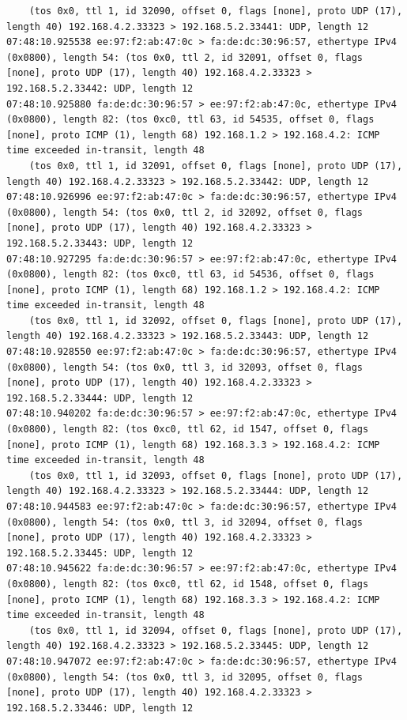 \documentclass[a4paper,12pt]{article}
\begin{document}
\begin{Verbatim}
	(tos 0x0, ttl 1, id 32090, offset 0, flags [none], proto UDP (17), length 40) 192.168.4.2.33323 > 192.168.5.2.33441: UDP, length 12
07:48:10.925538 ee:97:f2:ab:47:0c > fa:de:dc:30:96:57, ethertype IPv4 (0x0800), length 54: (tos 0x0, ttl 2, id 32091, offset 0, flags [none], proto UDP (17), length 40) 192.168.4.2.33323 > 192.168.5.2.33442: UDP, length 12
07:48:10.925880 fa:de:dc:30:96:57 > ee:97:f2:ab:47:0c, ethertype IPv4 (0x0800), length 82: (tos 0xc0, ttl 63, id 54535, offset 0, flags [none], proto ICMP (1), length 68) 192.168.1.2 > 192.168.4.2: ICMP time exceeded in-transit, length 48
	(tos 0x0, ttl 1, id 32091, offset 0, flags [none], proto UDP (17), length 40) 192.168.4.2.33323 > 192.168.5.2.33442: UDP, length 12
07:48:10.926996 ee:97:f2:ab:47:0c > fa:de:dc:30:96:57, ethertype IPv4 (0x0800), length 54: (tos 0x0, ttl 2, id 32092, offset 0, flags [none], proto UDP (17), length 40) 192.168.4.2.33323 > 192.168.5.2.33443: UDP, length 12
07:48:10.927295 fa:de:dc:30:96:57 > ee:97:f2:ab:47:0c, ethertype IPv4 (0x0800), length 82: (tos 0xc0, ttl 63, id 54536, offset 0, flags [none], proto ICMP (1), length 68) 192.168.1.2 > 192.168.4.2: ICMP time exceeded in-transit, length 48
	(tos 0x0, ttl 1, id 32092, offset 0, flags [none], proto UDP (17), length 40) 192.168.4.2.33323 > 192.168.5.2.33443: UDP, length 12
07:48:10.928550 ee:97:f2:ab:47:0c > fa:de:dc:30:96:57, ethertype IPv4 (0x0800), length 54: (tos 0x0, ttl 3, id 32093, offset 0, flags [none], proto UDP (17), length 40) 192.168.4.2.33323 > 192.168.5.2.33444: UDP, length 12
07:48:10.940202 fa:de:dc:30:96:57 > ee:97:f2:ab:47:0c, ethertype IPv4 (0x0800), length 82: (tos 0xc0, ttl 62, id 1547, offset 0, flags [none], proto ICMP (1), length 68) 192.168.3.3 > 192.168.4.2: ICMP time exceeded in-transit, length 48
	(tos 0x0, ttl 1, id 32093, offset 0, flags [none], proto UDP (17), length 40) 192.168.4.2.33323 > 192.168.5.2.33444: UDP, length 12
07:48:10.944583 ee:97:f2:ab:47:0c > fa:de:dc:30:96:57, ethertype IPv4 (0x0800), length 54: (tos 0x0, ttl 3, id 32094, offset 0, flags [none], proto UDP (17), length 40) 192.168.4.2.33323 > 192.168.5.2.33445: UDP, length 12
07:48:10.945622 fa:de:dc:30:96:57 > ee:97:f2:ab:47:0c, ethertype IPv4 (0x0800), length 82: (tos 0xc0, ttl 62, id 1548, offset 0, flags [none], proto ICMP (1), length 68) 192.168.3.3 > 192.168.4.2: ICMP time exceeded in-transit, length 48
	(tos 0x0, ttl 1, id 32094, offset 0, flags [none], proto UDP (17), length 40) 192.168.4.2.33323 > 192.168.5.2.33445: UDP, length 12
07:48:10.947072 ee:97:f2:ab:47:0c > fa:de:dc:30:96:57, ethertype IPv4 (0x0800), length 54: (tos 0x0, ttl 3, id 32095, offset 0, flags [none], proto UDP (17), length 40) 192.168.4.2.33323 > 192.168.5.2.33446: UDP, length 12

\end{Verbatim}
\end{document}
